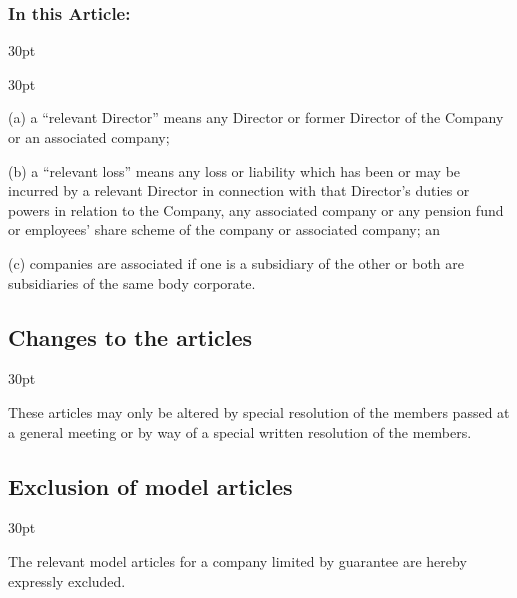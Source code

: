 \documentclass[12pt]{article}
\def\clauseindent{30pt}
\newenvironment{subindentpara}{\begin{adjustwidth}{\clauseindent}{}\begin{hanginglist}}{\end{hanginglist}\end{adjustwidth}}
\newenvironment{subindentlist}{\begin{adjustwidth}{\clauseindent}{}\begin{labeledlist}{\clauseindent}}{\end{labeledlist}\end{adjustwidth}}
\begin{document}
\subsubsection[Specifics of purchase and maintainance of insurance]{In this Article:}
\begin{subindentlist}
    \item [(a)] a ``relevant Director'' means any Director or former Director of the Company or an associated company;
    \item [(b)] a ``relevant loss'' means any loss or liability which has been or may be incurred by a relevant Director in connection with that Director's duties or powers in relation to the Company, any associated company or any pension fund or employees' share scheme of the company or associated company; an
    \item [(c)] companies are associated if one is a subsidiary of the other or both are subsidiaries of the same body corporate.
\end{subindentlist}

\subsection{Changes to the articles}
\begin{subindentpara}
    \item These articles may only be altered by special resolution of the members passed at a general meeting or by way of a special written resolution of the members.
\end{subindentpara}

\subsection{Exclusion of model articles}
\begin{subindentpara}
    \item The relevant model articles for a company limited by guarantee are hereby expressly excluded.
\end{subindentpara}
\end{document}
